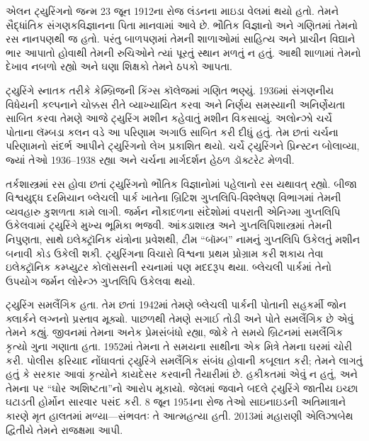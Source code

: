 \begingroup
\makeatletter{}\makeatother


\label{guunit:OLP-0631}


એલન ટ્યુરિંગનો જન્મ 23 જૂન
1912ના રોજ લંડનના માઇડા
વેલમાં થયો હતો. તેમને
સૈદ્ધાંતિક સંગણકવિજ્ઞાનના
પિતા માનવામાં આવે છે.
ભૌતિક વિજ્ઞાનો અને ગણિતમાં
તેમનો રસ નાનપણથી જ હતો.
પરંતુ બાળપણમાં તેમની
શાળાઓમાં સાહિત્ય અને
પ્રાચીન વિદ્યાને ભાર
આપાતો હોવાથી તેમની
રુચિઓને ત્યાં પૂરતું
સ્થાન મળતું ન હતું.
આથી શાળામાં તેમનો
દેખાવ નબળો રહ્યો અને
ઘણા શિક્ષકો તેમને
ઠપકો આપતા.


ટ્યુરિંગે સ્નાતક તરીકે
કેમ્બ્રિજની કિંગ્સ
કૉલેજમાં ગણિત ભણ્યું.
1936માં સંગણનીય
વિધેયની કલ્પનાને
ચોક્કસ રીતે વ્યાખ્યાયિત
કરવા અને નિર્ણય
સમસ્યાની અનિર્ણેયતા
સાબિત કરવા તેમણે
આજે ટ્યુરિંગ મશીન
કહેવાતું મશીન વિકસાવ્યું.
અલોન્ઝો ચર્ચે પોતાના
લૅમ્બડા કલન વડે આ
પરિણામ અગાઉ સાબિત
કરી દીધું હતું.
તેમ છતાં ચર્ચના
પરિણામનો સંદર્ભ
આપીને ટ્યુરિંગનો
લેખ પ્રકાશિત થયો.
ચર્ચે ટ્યુરિંગને
પ્રિન્સ્ટન બોલાવ્યા,
જ્યાં તેઓ 1936--1938
રહ્યા અને ચર્ચના
માર્ગદર્શન હેઠળ
ડૉક્ટરેટ મેળવી.

તર્કશાસ્ત્રમાં રસ હોવા
છતાં ટ્યુરિંગનો ભૌતિક
વિજ્ઞાનોમાં પહેલાનો
રસ યથાવત્ રહ્યો.
બીજા વિશ્વયુદ્ધ દરમિયાન
બ્લેચલી પાર્ક ખાતેના
બ્રિટિશ ગુપ્તલિપિ-વિશ્લેષણ
વિભાગમાં તેમની વ્યવહારુ
કુશળતા કામે લાગી.
જર્મન નૌકાદળના
સંદેશોમાં વપરાતી
એનિગ્મા ગુપ્તલિપિ
ઉકેલવામાં ટ્યુરિંગે
મુખ્ય ભૂમિકા ભજવી.
આંકડાશાસ્ત્ર અને
ગુપ્તલિપિશાસ્ત્રમાં
તેમની નિપુણતા,
સાથે ઇલેક્ટ્રૉનિક
યંત્રોના પ્રવેશથી,
ટીમ “બૉમ્બ”
નામનું ગુપ્તલિપિ
ઉકેલતું મશીન બનાવી
કોડ ઉકેલી શકી.
ટ્યુરિંગના વિચારો
વિશ્વના પ્રથમ
પ્રોગ્રામ કરી શકાય
તેવા ઇલેક્ટ્રૉનિક
કમ્પ્યુટર કોલૉસસની
રચનામાં પણ મદદરૂપ
થયા. બ્લેચલી
પાર્કમાં તેનો
ઉપયોગ જર્મન
લોરેન્ઝ ગુપ્તલિપિ
ઉકેલવા થયો.

ટ્યુરિંગ સમલૈંગિક
હતા. તેમ છતાં
1942માં તેમણે
બ્લેચલી પાર્કની
પોતાની સહકર્મી
જોન ક્લાર્કને
લગ્નનો પ્રસ્તાવ
મૂક્યો. પાછળથી
તેમણે સગાઈ તોડી
અને પોતે સમલૈંગિક
છે એવું તેમને
કહ્યું. જીવનમાં
તેમના અનેક
પ્રેમસંબંધો રહ્યા,
જોકે તે સમયે
બ્રિટનમાં સમલૈંગિક
કૃત્યો ગુના
ગણાતા હતા.
1952માં તેમના
તે સમયના સાથીના
એક મિત્રે તેમના
ઘરમાં ચોરી કરી.
પોલીસ ફરિયાદ
નોંધાવતાં ટ્યુરિંગે
સમલૈંગિક સંબંધ
હોવાની કબૂલાત
કરી; તેમને
લાગતું હતું કે
સરકાર આવાં
કૃત્યોને કાયદેસર
કરવાની તૈયારીમાં
છે. હકીકતમાં એવું
ન હતું, અને
તેમના પર
“ઘોર અશિષ્ટતા”નો
આરોપ મૂકાયો.
જેલમાં જવાને
બદલે ટ્યુરિંગે
જાતીય ઇચ્છા
ઘટાડતી હોર્મોન
સારવાર પસંદ કરી.
8 જૂન 1954ના
રોજ તેઓ
સાઇનાઇડની
અતિમાત્રાને કારણે
મૃત હાલતમાં
મળ્યા—સંભવતઃ
તે આત્મહત્યા
હતી. 2013માં
મહારાણી એલિઝાબેથ
દ્વિતીયે તેમને
રાજક્ષમા આપી.

